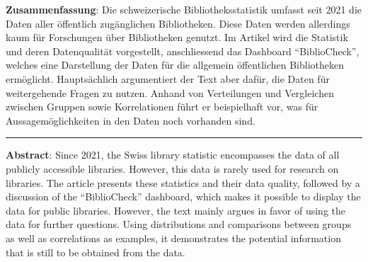 \textbf{Zusammenfassung}: Die schweizerische Bibliotheksstatistik umfasst
seit 2021 die Daten aller öffentlich zugänglichen Bibliotheken. Diese
Daten werden allerdings kaum für Forschungen über Bibliotheken genutzt.
Im Artikel wird die Statistik und deren Datenqualität vorgestellt,
anschliessend das Dashboard \enquote{BiblioCheck}, welches eine Darstellung der
Daten für die allgemein öffentlichen Bibliotheken ermöglicht.
Hauptsächlich argumentiert der Text aber dafür, die Daten für
weitergehende Fragen zu nutzen. Anhand von Verteilungen und Vergleichen
zwischen Gruppen sowie Korrelationen führt er beispielhaft vor, was für
Aussagemöglichkeiten in den Daten noch vorhanden sind.

\begin{center}\rule{0.5\linewidth}{0.5pt}\end{center}

\textbf{Abstract}: Since 2021, the Swiss library statistic encompasses
the data of all publicly accessible libraries. However, this data is
rarely used for research on libraries. The article presents these
statistics and their data quality, followed by a discussion of the
\enquote{BiblioCheck} dashboard, which makes it possible to display the data
for public libraries. However, the text mainly argues in favor of using
the data for further questions. Using distributions and comparisons
between groups as well as correlations as examples, it demonstrates the
potential information that is still to be obtained from the data.
